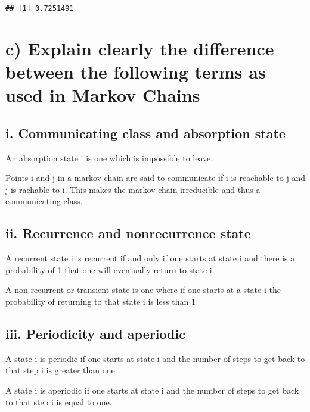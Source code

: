\documentclass[
]{article}
\begin{document}
\begin{verbatim}
## [1] 0.7251491
\end{verbatim}

\hypertarget{c-explain-clearly-the-difference-between-the-following-terms-as-used-in-markov-chains}{%
\section{c) Explain clearly the difference between the following terms
as used in Markov
Chains}\label{c-explain-clearly-the-difference-between-the-following-terms-as-used-in-markov-chains}}

\hypertarget{i.-communicating-class-and-absorption-state}{%
\subsection{i. Communicating class and absorption
state}\label{i.-communicating-class-and-absorption-state}}

An absorption state i is one which is impossible to leave.

Points i and j in a markov chain are said to communicate if i is
reachable to j and j is rachable to i. This makes the markov chain
irreducible and thus a communicating class.

\hypertarget{ii.-recurrence-and-nonrecurrence-state}{%
\subsection{ii. Recurrence and nonrecurrence
state}\label{ii.-recurrence-and-nonrecurrence-state}}

A recurrent state i is recurrent if and only if one starts at state i
and there is a probability of 1 that one will eventually return to state
i.

A non recurrent or transient state is one where if one starts at a state
i the probability of returning to that state i is less than 1

\hypertarget{iii.-periodicity-and-aperiodic}{%
\subsection{iii. Periodicity and
aperiodic}\label{iii.-periodicity-and-aperiodic}}

A state i is periodic if one starts at state i and the number of steps
to get back to that step i is greater than one.

A state i is aperiodic if one starts at state i and the number of steps
to get back to that step i is equal to one.
\end{document}
